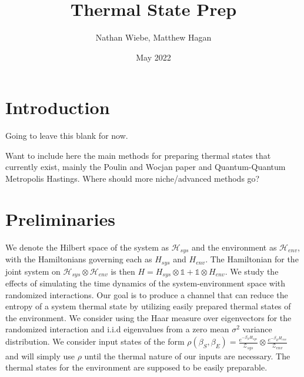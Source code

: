 \documentclass{article}
\title{Thermal State Prep}
\author{Nathan Wiebe, Matthew Hagan}
\date{May 2022}
\newcommand{\hilb}{\mathcal{H}}
\newcommand{\partfun}{\mathcal{Z}}
\newcommand{\identity}{\mathds{1}}
\begin{document}
\maketitle

\section{Introduction}
Going to leave this blank for now. 

Want to include here the main methods for preparing thermal states that currently exist, mainly the Poulin and Wocjan paper and Quantum-Quantum Metropolis Hastings. Where should more niche/advanced methods go? \cite{shiraishi_undecidability_2021}

\section{Preliminaries}
We denote the Hilbert space of the system as $\hilb_{sys}$ and the environment as $\hilb_{env}$, with the Hamiltonians governing each as $H_{sys}$ and $H_{env}$. The Hamiltonian for the joint system on $\hilb_{sys} \otimes \hilb_{env}$ is then $H = H_{sys} \otimes \identity + \identity \otimes H_{env}$. We study the effects of simulating the time dynamics of the system-environment space with randomized interactions. Our goal is to produce a channel that can reduce the entropy of a system thermal state by utilizing easily prepared thermal states of the environment. We consider using the Haar measure over eigenvectors for the randomized interaction and i.i.d eigenvalues from a zero mean $\sigma^2$ variance distribution. We consider input states of the form $\rho(\beta_S, \beta_E) = \frac{e^{-\beta_S H_{sys}}}{\partfun_{sys}} \otimes \frac{e^{-\beta_E H_{env}}}{\partfun_{env}}$ and will simply use $\rho$ until the thermal nature of our inputs are necessary. The thermal states for the environment are supposed to be easily preparable.
\end{document}
